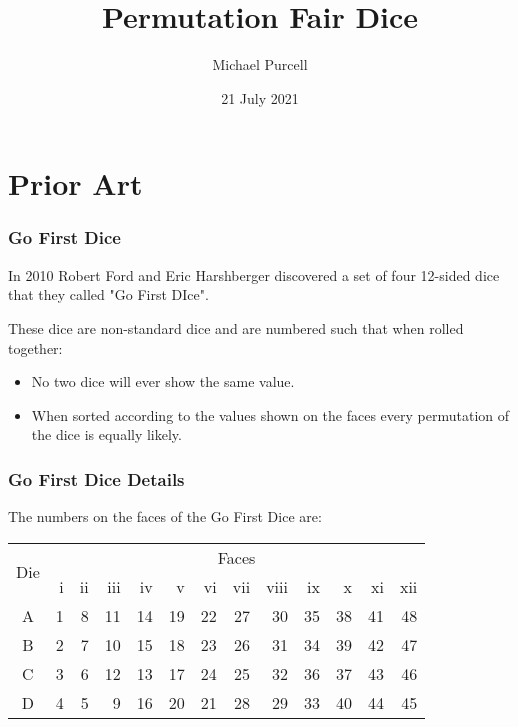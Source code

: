 \documentclass[aspectratio=169]{beamer}
\title{Permutation Fair Dice}
\author{Michael Purcell}
\date{21 July 2021}
\begin{document}
\begin{frame}[Triangle=siiorange]
\titlepage
\end{frame}

\section{Prior Art}
\begin{frame}[Triangle=siiorange]
	\tocpage
\end{frame}

\begin{frame}[triangle=siiblue]
\frametitle{Go First Dice}
In 2010 Robert Ford and Eric Harshberger discovered a set of four 12-sided dice that they called "Go First DIce".

\vfill

These dice are non-standard dice and are numbered such that when rolled together:
\begin{itemize}
	\item No two dice will ever show the same value.
	\item When sorted according to the values shown on the faces every permutation of the dice is equally likely.
\end{itemize}
\end{frame}

\begin{frame}[triangle=siiblue]
\frametitle{Go First Dice Details}
The numbers on the faces of the Go First Dice are:
\begin{table}
\begin{tabular}{c rrrrrrrrrrrr} \toprule
\multirow{2}[2]{*}{Die} &  \multicolumn{12}{c}{Faces} \\ \cmidrule(lr){2-13}     
   & i & ii & iii & iv & v & vi & vii & viii & ix & x & xi & xii \\ \midrule
A & 1 & 8 & 11 & 14 & 19 & 22 & 27 & 30 & 35 & 38 & 41 & 48 \\
B & 2 & 7 & 10 & 15 & 18 & 23 & 26 & 31 & 34 & 39 & 42 & 47 \\
C & 3 & 6 & 12 & 13 & 17 & 24 & 25 & 32 & 36 & 37 & 43 & 46 \\
D & 4 & 5 & 9 & 16 & 20 & 21 & 28 & 29 & 33 & 40 & 44 & 45 \\ \bottomrule
\end{tabular}
\end{table}
\end{frame}
\end{document}
